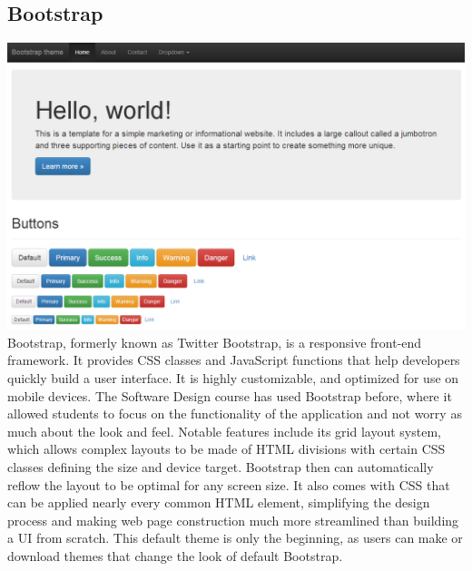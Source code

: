 \documentclass[12pt]{article}
\begin{document}
\subsection{Bootstrap}\label{sec:bootstrap}
\includegraphics[width=\linewidth]{img/bootstrap.png}
Bootstrap, formerly known as Twitter Bootstrap, is a responsive front-end framework. It provides CSS classes and JavaScript functions that help developers quickly build a user interface. It is highly customizable, and optimized for use on mobile devices. The Software Design course has used Bootstrap before, where it allowed students to focus on the functionality of the application and not worry as much about the look and feel. Notable features include its grid layout system, which allows complex layouts to be made of HTML divisions with certain CSS classes defining the size and device target. Bootstrap then can automatically reflow the layout to be optimal for any screen size. It also comes with CSS that can be applied nearly every common HTML element, simplifying the design process and making web page construction much more streamlined than building a UI from scratch. This default theme is only the beginning, as users can make or download themes that change the look of default Bootstrap.
\end{document}
